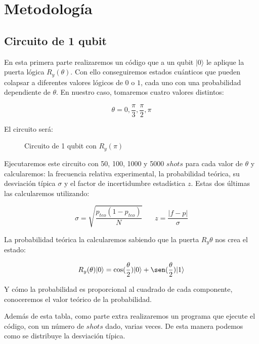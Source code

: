 \documentclass[11pt, a4paper, twocolumn]{article}
\begin{document}
\section{Metodología}

\subsection{Circuito de 1 qubit}

En esta primera parte realizaremos un código que a un qubit $|0\rangle $ le 
aplique la puerta lógica $R_y({\theta})$. Con ello conseguiremos estados cuánticos
que pueden colapsar a diferentes valores lógicos de $0$ o $1$, cada uno con 
una probabilidad dependiente de $\theta$. En nuestro caso, tomaremos cuatro
valores distintos: 

\begin{equation}
	\theta = 0,\frac{\pi}{3},\frac{\pi}{2},\pi
\end{equation}

El circuito será: 

\begin{figure}[h]
	\centering
	
	\caption{Circuito de 1 qubit con $R_y(\pi)$}
	\label{circ1qb}
\end{figure}

Ejecutaremos este circuito con 50, 100, 1000 y 5000 $shots$ para cada valor
de $\theta$ y calcularemos: la frecuencia relativa experimental, la 
probabilidad teórica, su desviación típica $\sigma$ y el factor  de incertidumbre estadística $z$. 
Estas dos últimas las calcularemos utilizando:

\begin{equation}
	\sigma= \sqrt{\frac{p_{teo}(1-p_{teo})}{N}}\:\:\:\:\:\:\:\:
	z = \frac{|f-p|}{\sigma}
\end{equation}

La probabilidad teórica la calcularemos sabiendo que la puerta $R_y{\theta}$ nos
crea el estado:

\begin{equation}
	R_y(\theta)|0\rangle = \cos(\frac{\theta}{2})|0\rangle + \sen(\frac{\theta}{2})|1\rangle
\end{equation}

Y cómo la probabilidad es proporcional al cuadrado de cada componente, conoceremos
el valor teórico de la probabilidad.

\vspace{0.2cm}

Además de esta tabla, como parte extra realizaremos un programa que 
ejecute el código, con un número de $shots$ dado, varias veces. De esta
manera podemos como se distribuye la desviación típica.
\end{document}
